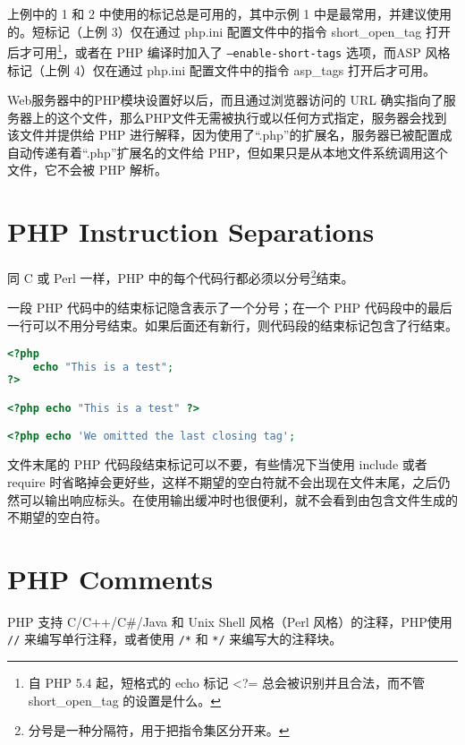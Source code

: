 上例中的 1 和 2 中使用的标记总是可用的，其中示例 1 中是最常用，并建议使用的。短标记（上例 3）仅在通过 php.ini 配置文件中的指令 short\_open\_tag 打开后才可用\footnote{自 PHP 5.4 起，短格式的 echo 标记 <?= 总会被识别并且合法，而不管 short\_open\_tag 的设置是什么。}，或者在 PHP 编译时加入了 \texttt{--enable-short-tags} 选项，而ASP 风格标记（上例 4）仅在通过 php.ini 配置文件中的指令 asp\_tags 打开后才可用。

Web服务器中的PHP模块设置好以后，而且通过浏览器访问的 URL 确实指向了服务器上的这个文件，那么PHP文件无需被执行或以任何方式指定，服务器会找到该文件并提供给 PHP 进行解释，因为使用了“.php”的扩展名，服务器已被配置成自动传递有着“.php”扩展名的文件给 PHP，但如果只是从本地文件系统调用这个文件，它不会被 PHP 解析。



\section{PHP Instruction Separations}

同 C 或 Perl 一样，PHP 中的每个代码行都必须以分号\footnote{分号是一种分隔符，用于把指令集区分开来。}结束。

一段 PHP 代码中的结束标记隐含表示了一个分号；在一个 PHP 代码段中的最后一行可以不用分号结束。如果后面还有新行，则代码段的结束标记包含了行结束。

\begin{lstlisting}[language=PHP]
<?php
    echo "This is a test";
?>

<?php echo "This is a test" ?>

<?php echo 'We omitted the last closing tag';
\end{lstlisting}

文件末尾的 PHP 代码段结束标记可以不要，有些情况下当使用 include 或者 require 时省略掉会更好些，这样不期望的空白符就不会出现在文件末尾，之后仍然可以输出响应标头。在使用输出缓冲时也很便利，就不会看到由包含文件生成的不期望的空白符。









\section{PHP Comments}

PHP 支持 C/C++/C\#/Java 和 Unix Shell 风格（Perl 风格）的注释，PHP使用 \texttt{//} 来编写单行注释，或者使用 \texttt{/*} 和 \texttt{*/} 来编写大的注释块。


